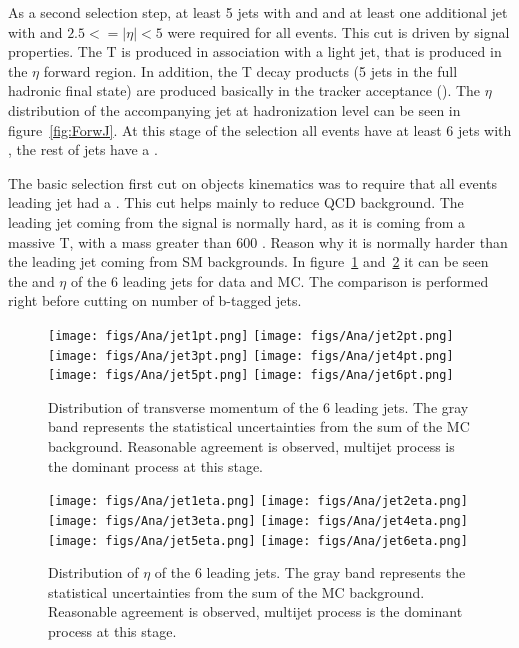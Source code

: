 As a second selection step, at least 5 jets with  and  and at least one additional jet with  and $2.5<=|\eta|<5$ were required for all events. This cut is driven by signal properties. The T is produced in association with a light jet, that is produced in the $\eta$ forward region. In addition, the T decay products (5 jets in the full hadronic final state) are produced basically in the tracker acceptance (). The $\eta$ distribution of the accompanying jet at hadronization level can be seen in figure~\ref{fig:ForwJ}. At this stage of the selection all events have at least 6 jets with , the rest of jets have a . 

The basic selection first cut on objects kinematics was to require that all events leading jet had a . This cut helps mainly to reduce QCD background. The leading jet coming from the signal is normally hard, as it is coming from a massive T, with a mass greater than 600 \GeVcc. Reason why it is normally harder than the leading jet coming from SM backgrounds. In figure~\ref{fig:6jpt} and~\ref{fig:6jeta} it can be seen the \pt and $\eta$ of the 6 leading jets for data and MC. The comparison is performed right before cutting on number of b-tagged jets.

\begin{figure}[!Hhtbp]
  \begin{center}
    \texttt{[image: figs/Ana/jet1pt.png]}
    \texttt{[image: figs/Ana/jet2pt.png]}
    \texttt{[image: figs/Ana/jet3pt.png]}
    \texttt{[image: figs/Ana/jet4pt.png]}
    \texttt{[image: figs/Ana/jet5pt.png]}
    \texttt{[image: figs/Ana/jet6pt.png]}
    \caption{Distribution of transverse momentum of the 6 leading jets. The gray band represents the statistical uncertainties from the sum of the MC background. Reasonable agreement is observed, multijet process is the dominant process at this stage.}
    \label{fig:6jpt}
  \end{center}
\end{figure}

\begin{figure}[!Hhtbp]
  \begin{center}
    \texttt{[image: figs/Ana/jet1eta.png]}
    \texttt{[image: figs/Ana/jet2eta.png]}
    \texttt{[image: figs/Ana/jet3eta.png]}
    \texttt{[image: figs/Ana/jet4eta.png]}
    \texttt{[image: figs/Ana/jet5eta.png]}
    \texttt{[image: figs/Ana/jet6eta.png]}
    \caption{Distribution of $\eta$ of the 6 leading jets. The gray band represents the statistical uncertainties from the sum of the MC background. Reasonable agreement is observed, multijet process is the dominant process at this stage.}
    \label{fig:6jeta}
  \end{center}
\end{figure}

